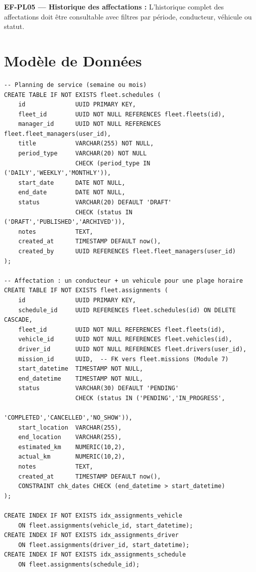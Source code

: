 \documentclass[12pt,a4paper]{report}
\begin{document}
\begin{reqbox}
\textbf{EF-PL05 — Historique des affectations :} L'historique complet des affectations doit être consultable avec filtres par période, conducteur, véhicule ou statut.
\end{reqbox}

\section{Modèle de Données}

\begin{lstlisting}[style=sqlStyle, caption={Tables du module Planification}]
-- Planning de service (semaine ou mois)
CREATE TABLE IF NOT EXISTS fleet.schedules (
    id              UUID PRIMARY KEY,
    fleet_id        UUID NOT NULL REFERENCES fleet.fleets(id),
    manager_id      UUID NOT NULL REFERENCES fleet.fleet_managers(user_id),
    title           VARCHAR(255) NOT NULL,
    period_type     VARCHAR(20) NOT NULL
                    CHECK (period_type IN ('DAILY','WEEKLY','MONTHLY')),
    start_date      DATE NOT NULL,
    end_date        DATE NOT NULL,
    status          VARCHAR(20) DEFAULT 'DRAFT'
                    CHECK (status IN ('DRAFT','PUBLISHED','ARCHIVED')),
    notes           TEXT,
    created_at      TIMESTAMP DEFAULT now(),
    created_by      UUID REFERENCES fleet.fleet_managers(user_id)
);

-- Affectation : un conducteur + un vehicule pour une plage horaire
CREATE TABLE IF NOT EXISTS fleet.assignments (
    id              UUID PRIMARY KEY,
    schedule_id     UUID REFERENCES fleet.schedules(id) ON DELETE CASCADE,
    fleet_id        UUID NOT NULL REFERENCES fleet.fleets(id),
    vehicle_id      UUID NOT NULL REFERENCES fleet.vehicles(id),
    driver_id       UUID NOT NULL REFERENCES fleet.drivers(user_id),
    mission_id      UUID,  -- FK vers fleet.missions (Module 7)
    start_datetime  TIMESTAMP NOT NULL,
    end_datetime    TIMESTAMP NOT NULL,
    status          VARCHAR(30) DEFAULT 'PENDING'
                    CHECK (status IN ('PENDING','IN_PROGRESS',
                                      'COMPLETED','CANCELLED','NO_SHOW')),
    start_location  VARCHAR(255),
    end_location    VARCHAR(255),
    estimated_km    NUMERIC(10,2),
    actual_km       NUMERIC(10,2),
    notes           TEXT,
    created_at      TIMESTAMP DEFAULT now(),
    CONSTRAINT chk_dates CHECK (end_datetime > start_datetime)
);

CREATE INDEX IF NOT EXISTS idx_assignments_vehicle
    ON fleet.assignments(vehicle_id, start_datetime);
CREATE INDEX IF NOT EXISTS idx_assignments_driver
    ON fleet.assignments(driver_id, start_datetime);
CREATE INDEX IF NOT EXISTS idx_assignments_schedule
    ON fleet.assignments(schedule_id);
\end{lstlisting}
\end{document}

